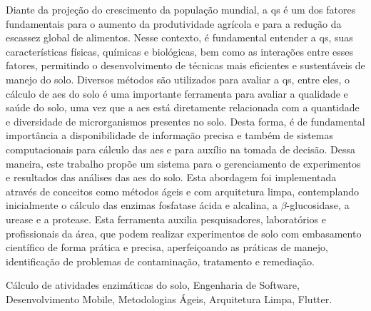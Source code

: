 
Diante da projeção do crescimento da população mundial, a \ac{qs} é um dos fatores fundamentais para o aumento da produtividade agrícola e para a redução da escassez global de alimentos. Nesse contexto, é fundamental entender a \ac{qs}, suas características físicas, químicas e biológicas, bem como as interações entre esses fatores, permitindo o desenvolvimento de técnicas mais eficientes e sustentáveis de manejo do solo. Diversos métodos são utilizados para avaliar a \ac{qs}, entre eles, o cálculo de \acp{ae} do solo é uma importante ferramenta para avaliar a qualidade e saúde do solo, uma vez que a \acp{ae} está diretamente relacionada com a quantidade e diversidade de microrganismos presentes no solo. Desta forma, é de fundamental importância a disponibilidade de informação precisa e também de sistemas computacionais para cálculo das \acp{ae} e para auxílio na tomada de decisão. Dessa maneira, este trabalho propõe um sistema para o gerenciamento de experimentos e resultados das análises das \acp{ae} do solo. Esta abordagem foi implementada através de conceitos como métodos ágeis e com arquitetura limpa, contemplando inicialmente o cálculo das enzimas fosfatase ácida e alcalina, a $\beta$-glucosidase, a urease e a protease. Esta ferramenta auxilia pesquisadores, laboratórios e profissionais da área, que podem realizar experimentos de solo com embasamento científico de forma prática e precisa, aperfeiçoando as práticas de manejo, identificação de problemas de contaminação, tratamento e remediação. 

\begin{keywords}
Cálculo de atividades enzimáticas do solo, Engenharia de Software, Desenvolvimento Mobile, Metodologias Ágeis, Arquitetura Limpa, Flutter.
\end{keywords}
